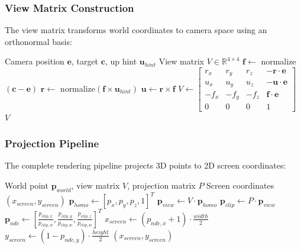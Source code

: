 \documentclass[11pt]{article}
\begin{document}
\subsubsection{View Matrix Construction}

The view matrix transforms world coordinates to camera space using an orthonormal basis:

\begin{algorithm}[H]
\caption{Construct View Matrix}
\begin{algorithmic}[1]
\Require Camera position $\mathbf{e}$, target $\mathbf{c}$, up hint $\mathbf{u}_{hint}$
\Ensure View matrix $V \in \mathbb{R}^{4 \times 4}$
\State $\mathbf{f} \gets$ normalize$(\mathbf{c} - \mathbf{e})$ 
\State $\mathbf{r} \gets$ normalize$(\mathbf{f} \times \mathbf{u}_{hint})$ 
\State $\mathbf{u} \gets \mathbf{r} \times \mathbf{f}$ 
\State $V \gets \begin{bmatrix}
r_x & r_y & r_z & -\mathbf{r} \cdot \mathbf{e} \\
u_x & u_y & u_z & -\mathbf{u} \cdot \mathbf{e} \\
-f_x & -f_y & -f_z & \mathbf{f} \cdot \mathbf{e} \\
0 & 0 & 0 & 1
\end{bmatrix}$
\State \Return $V$
\end{algorithmic}
\end{algorithm}

\subsubsection{Projection Pipeline}

The complete rendering pipeline projects 3D points to 2D screen coordinates:

\begin{algorithm}[H]
\caption{3D to 2D Projection}
\begin{algorithmic}[1]
\Require World point $\mathbf{p}_{world}$, view matrix $V$, projection matrix $P$
\Ensure Screen coordinates $(x_{screen}, y_{screen})$
\State $\mathbf{p}_{homo} \gets [p_x, p_y, p_z, 1]^T$ 
\State $\mathbf{p}_{view} \gets V \cdot \mathbf{p}_{homo}$ 
\State $\mathbf{p}_{clip} \gets P \cdot \mathbf{p}_{view}$ 
\State $\mathbf{p}_{ndc} \gets [\frac{p_{clip,x}}{p_{clip,w}}, \frac{p_{clip,y}}{p_{clip,w}}, \frac{p_{clip,z}}{p_{clip,w}}]^T$ 
\State $x_{screen} \gets (p_{ndc,x} + 1) \cdot \frac{width}{2}$ 
\State $y_{screen} \gets (1 - p_{ndc,y}) \cdot \frac{height}{2}$ 
\State \Return $(x_{screen}, y_{screen})$
\end{algorithmic}
\end{algorithm}
\end{document}
